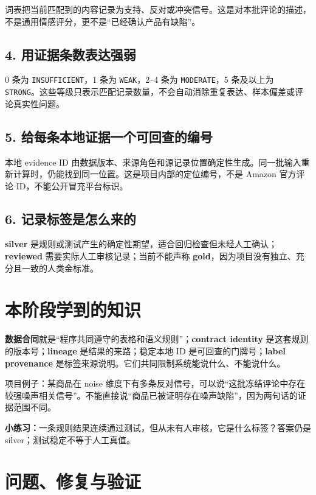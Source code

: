 词表把当前匹配到的内容记录为支持、反对或冲突信号。这是对本批评论的描述，不是通用情感评分，更不是“已经确认产品有缺陷”。

\subsection{4. 用证据条数表达强弱}

0 条为 \texttt{INSUFFICIENT}，1 条为 \texttt{WEAK}，2--4 条为 \texttt{MODERATE}，5 条及以上为 \texttt{STRONG}。这些等级只表示匹配记录数量，不会自动消除重复表达、样本偏差或评论真实性问题。

\subsection{5. 给每条本地证据一个可回查的编号}

本地 evidence ID 由数据版本、来源角色和源记录位置确定性生成。同一批输入重新计算时，仍能找到同一位置。这是项目内部的定位编号，不是 Amazon 官方评论 ID，不能公开冒充平台标识。

\subsection{6. 记录标签是怎么来的}

\textbf{silver} 是规则或测试产生的确定性期望，适合回归检查但未经人工确认；\textbf{reviewed} 需要实际人工审核记录；当前不能声称 \textbf{gold}，因为项目没有独立、充分且一致的人类金标准。

\section{本阶段学到的知识}

\textbf{数据合同}就是“程序共同遵守的表格和语义规则”；\textbf{contract identity} 是这套规则的版本号；\textbf{lineage} 是结果的来路；稳定本地 ID 是可回查的门牌号；\textbf{label provenance} 是标签来源说明。它们共同限制系统能说什么、不能说什么。

\begin{beginnerbox}
项目例子：某商品在 noise 维度下有多条反对信号，可以说“这批冻结评论中存在较强噪声相关信号”。不能直接说“商品已被证明存在噪声缺陷”，因为两句话的证据范围不同。
\end{beginnerbox}

\textbf{小练习：}一条规则结果连续通过测试，但从未有人审核，它是什么标签？答案仍是 silver；测试稳定不等于人工真值。

\section{问题、修复与验证}

